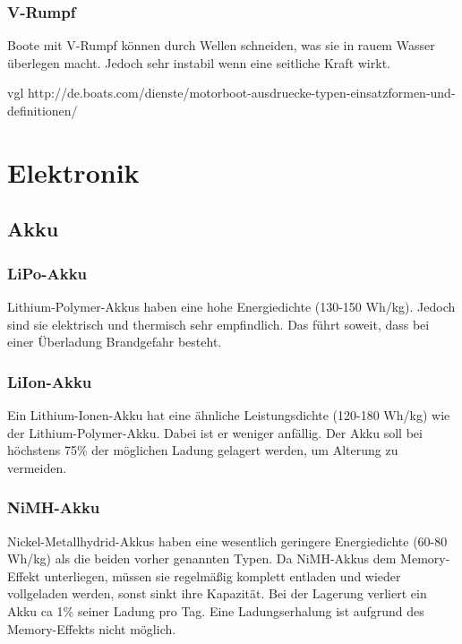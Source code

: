 \documentclass[a4paper]{article}
\begin{document}
\subsubsection{V-Rumpf}

Boote mit V-Rumpf können durch Wellen schneiden, was sie in rauem Wasser überlegen macht. Jedoch 
sehr instabil wenn eine seitliche Kraft wirkt.

vgl http://de.boats.com/dienste/motorboot-ausdruecke-typen-einsatzformen-und-definitionen/

\section{Elektronik}

\subsection{Akku}

\subsubsection{LiPo-Akku}

Lithium-Polymer-Akkus haben eine hohe Energiedichte (130-150 Wh/kg). Jedoch sind sie elektrisch 
und thermisch sehr empfindlich. Das führt soweit, dass bei einer Überladung Brandgefahr besteht.

\subsubsection{LiIon-Akku}

Ein Lithium-Ionen-Akku hat eine ähnliche Leistungsdichte (120-180 Wh/kg) wie der 
Lithium-Polymer-Akku. Dabei ist er weniger anfällig. Der Akku soll bei höchstens 75\% der 
möglichen Ladung gelagert werden, um Alterung zu vermeiden.

\subsubsection{NiMH-Akku}

Nickel-Metallhydrid-Akkus haben eine wesentlich geringere Energiedichte (60-80 Wh/kg) als die 
beiden vorher genannten Typen. Da NiMH-Akkus dem Memory-Effekt unterliegen, müssen sie regelmäßig 
komplett entladen und wieder vollgeladen werden, sonst sinkt ihre Kapazität. Bei der Lagerung 
verliert ein Akku ca 1\% seiner Ladung pro Tag. Eine Ladungserhalung ist aufgrund des 
Memory-Effekts nicht möglich.
\end{document}
